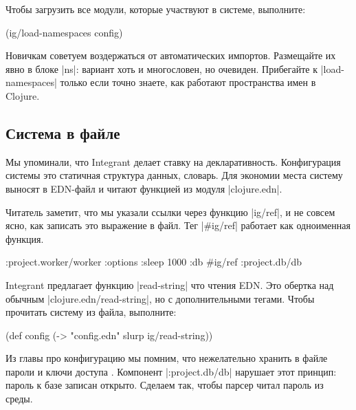 Чтобы загрузить все модули, которые участвуют в системе, выполните:

\begin{english}
  \begin{clojure}
(ig/load-namespaces config)
  \end{clojure}
\end{english}

Новичкам советуем воздержаться от автоматических импортов. Размещайте их явно в
блоке \spverb|ns|: вариант хоть и многословен, но очевиден. Прибегайте к
\spverb|load-namespaces| только если точно знаете, как работают пространства
имен в Clojure.

\subsection{Система в файле}

Мы упоминали, что Integrant делает ставку на декларативность. Конфигурация
системы это статичная структура данных, словарь. Для экономии места систему
выносят в EDN-файл и читают функцией из модуля \spverb|clojure.edn|.

Читатель заметит, что мы указали ссылки через функцию \spverb|ig/ref|, и не
совсем ясно, как записать это выражение в файл. Тег \spverb|#ig/ref| работает
как одноименная функция.

\begin{english}
  \begin{clojure}
{:project.worker/worker {:options {:sleep 1000}
                         :db #ig/ref :project.db/db}}
  \end{clojure}
\end{english}

Integrant предлагает функцию \spverb|read-string| что чтения EDN. Это обертка
над обычным \spverb|clojure.edn/read-string|, но с дополнительными тегами. Чтобы
прочитать систему из файла, выполните:

\begin{english}
  \begin{clojure}
(def config
  (-> "config.edn" slurp ig/read-string))
  \end{clojure}
\end{english}

Из главы про конфигурацию мы помним, что нежелательно хранить в файле пароли и
ключи доступа . Компонент \spverb|:project.db/db| нарушает
этот принцип: пароль к базе записан открыто. Сделаем так, чтобы парсер читал
пароль из среды.

